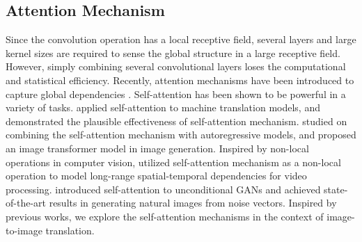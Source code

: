 \subsection{Attention Mechanism}
Since the convolution operation has a local receptive field, several layers and large kernel sizes are required to sense the global structure in a large receptive field. 
However, simply combining several convolutional layers loses the computational and statistical efficiency. 
Recently, attention mechanisms have been introduced to capture global dependencies \cite{AlignTranslate,ShowAttenTell}.
Self-attention \cite{Non-local,SAGANs} has been shown to be powerful in a variety of tasks.
\cite{Attention} applied self-attention to machine translation models, and demonstrated the plausible effectiveness of self-attention mechanism. 
\cite{Transformer} studied on combining the self-attention mechanism with autoregressive models, and proposed an image transformer model in image generation. 
Inspired by non-local operations in computer vision, \cite{Non-local} utilized self-attention mechanism as a non-local operation to model long-range spatial-temporal dependencies for video processing.
\cite{SAGANs} introduced self-attention to unconditional GANs and achieved state-of-the-art results in generating natural images from noise vectors. Inspired by previous works, we explore the self-attention mechanisms in the context of image-to-image translation. 
